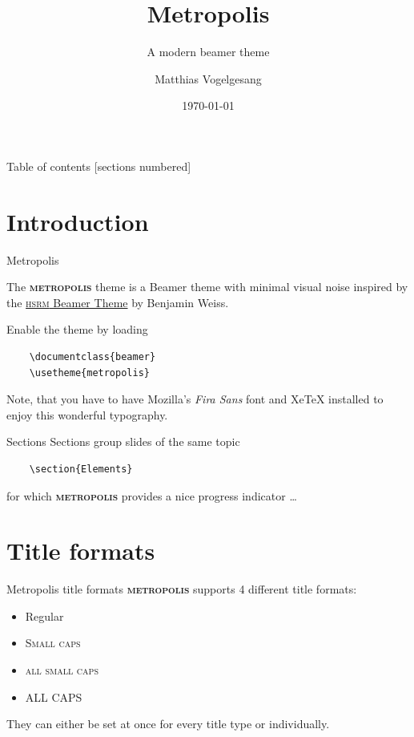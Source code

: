 ﻿\documentclass[10pt]{beamer}
\title{Metropolis}
\subtitle{A modern beamer theme}
\date{\today}
\author{Matthias Vogelgesang}
\institute{Center for modern beamer themes}
\newcommand{\themename}{\textbf{\textsc{metropolis}}\xspace}
\begin{document}
\maketitle

\begin{frame}{Table of contents}
  [sections numbered]
  \tableofcontents[hideallsubsections]
\end{frame}

\section{Introduction}

\begin{frame}[fragile]{Metropolis}

  The \themename theme is a Beamer theme with minimal visual noise
  inspired by the \href{https://github.com/hsrmbeamertheme/hsrmbeamertheme}{\textsc{hsrm} Beamer
  Theme} by Benjamin Weiss.

  Enable the theme by loading

  \begin{verbatim}    \documentclass{beamer}
    \usetheme{metropolis}\end{verbatim}

  Note, that you have to have Mozilla's \emph{Fira Sans} font and XeTeX
  installed to enjoy this wonderful typography.
\end{frame}
\begin{frame}[fragile]{Sections}
  Sections group slides of the same topic

  \begin{verbatim}    \section{Elements}\end{verbatim}

  for which \themename provides a nice progress indicator \ldots
\end{frame}

\section{Title formats}

\begin{frame}{Metropolis title formats}
	\themename supports 4 different title formats:
	\begin{itemize}
		\item Regular
		\item \textsc{Small caps}
		\item \textsc{all small caps}
		\item ALL CAPS
	\end{itemize}
	They can either be set at once for every title type or individually.
\end{frame}
\end{document}
